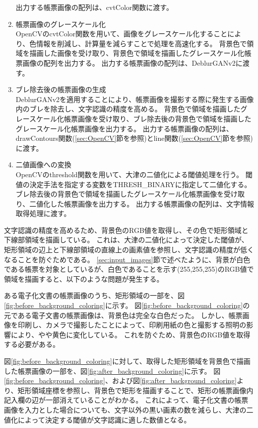 \begin{enumerate}
        出力する帳票画像の配列は、cvtColor関数に渡す。
    \item 帳票画像のグレースケール化\\
        OpenCVのcvtColor関数を用いて、画像をグレースケール化することにより、色情報を削減し、計算量を減らすことで処理を高速化する。
        背景色で領域を描画した画像を受け取り、背景色で領域を描画したグレースケール化帳票画像の配列を出力する。
        出力する帳票画像の配列は、DeblurGANv2に渡す。   
    \item ブレ除去後の帳票画像の生成\\
        DeblurGANv2を適用することにより、帳票画像を撮影する際に発生する画像内のブレを除去し、文字認識の精度を高める。
        背景色で領域を描画したグレースケール化帳票画像を受け取り、ブレ除去後の背景色で領域を描画したグレースケール化帳票画像を出力する。
        出力する帳票画像の配列は、drawContours関数(\ref{sec:OpenCV}節を参照)とline関数(\ref{sec:OpenCV}節を参照)に渡す。
    \item 二値画像への変換\\
        OpenCVのthreshold関数を用いて、大津の二値化による閾値処理を行う。
        閾値の決定手法を指定する変数をTHRESH\_BINARYに指定して二値化する。
        ブレ除去後の背景色で領域を描画したグレースケール化帳票画像を受け取り、二値化した帳票画像を出力する。
        出力する帳票画像の配列は、文字情報取得処理に渡す。
\end{enumerate}

文字認識の精度を高めるため、背景色のRGB値を取得し、その色で矩形領域と下線部領域を描画している。
これは、大津の二値化によって決定した閾値が、矩形領域の辺上と下線部領域の直線上の画素値を参照し、文字認識の精度が低くなることを防ぐためである。
\ref{sec:input_images}節で述べたように、背景が白色である帳票を対象としているが、白色であることを示す(255,255,255)のRGB値で領域を描画すると、以下のような問題が発生する。

ある電子化文書の帳票画像のうち、矩形領域の一部を、図\ref{fig:before_background_coloring}に示す。
図\ref{fig:before_background_coloring}の元である電子文書の帳票画像は、背景色は完全な白色だった。
しかし、帳票画像を印刷し、カメラで撮影したことによって、印刷用紙の色と撮影する照明の影響により、やや黄色に変化している。
これを防ぐため、背景色のRGB値を取得する必要がある。

図\ref{fig:before_background_coloring}に対して、取得した矩形領域を背景色で描画した帳票画像の一部を、図\ref{fig:after_background_coloring}に示す。
図\ref{fig:before_background_coloring}、および図\ref{fig:after_background_coloring}より、矩形領域座標を参照し、背景色で矩形を描画することで、矩形の帳票画像内記入欄の辺が一部消えていることがわかる。
これによって、電子化文書の帳票画像を入力とした場合についても、文字以外の黒い画素の数を減らし、大津の二値化によって決定する閾値が文字認識に適した数値となる。

